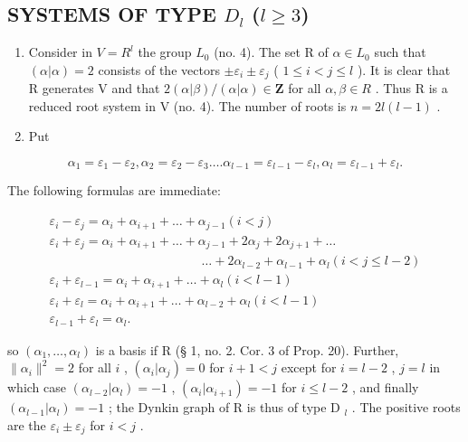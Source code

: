 \subsection{\texorpdfstring{SYSTEMS OF TYPE \(D_{l}\) (\(l \geqslant 3\))}{SYSTEMS OF TYPE D\_l (l >= 3)}}

\begin{enumerate}
\def\labelenumi{(\Roman{enumi})}
\item
  Consider in \(V = R^{l}\) the group \(L_{0}\) (no. 4). The set R of \(\alpha \in L_{0}\) such that \((\alpha|\alpha) = 2\) consists of the vectors \(\pm\varepsilon_{i} \pm \varepsilon_{j}\) ( \(1 \leqslant i < j \leqslant l\) ). It is clear that R generates V and that \(2(\alpha|\beta)/(\alpha|\alpha) \in \mathbf{Z}\) for all \(\alpha, \beta \in R\) . Thus R is a reduced root system in V (no. 4). The number of roots is \(n = 2l(l - 1)\) .
\item
  Put
\end{enumerate}

\[
\alpha_ {1} = \varepsilon_ {1} - \varepsilon_ {2}, \alpha_ {2} = \varepsilon_ {2} - \varepsilon_ {3} \dots . \alpha_ {l - 1} = \varepsilon_ {l - 1} - \varepsilon_ {l}, \alpha_ {l} = \varepsilon_ {l - 1} + \varepsilon_ {l}.
\]

The following formulas are immediate:

\[
\begin{array}{c} \varepsilon_ {i} - \varepsilon_ {j} = \alpha_ {i} + \alpha_ {i + 1} + \dots + \alpha_ {j - 1} (i <   j) \\ \varepsilon_ {i} + \varepsilon_ {j} = \alpha_ {i} + \alpha_ {i + 1} + \dots + \alpha_ {j - 1} + 2 \alpha_ {j} + 2 \alpha_ {j + 1} + \dots \\ \qquad \qquad \qquad \qquad \qquad \qquad \dots + 2 \alpha_ {l - 2} + \alpha_ {l - 1} + \alpha_ {l} (i <   j \leqslant l - 2) \\ \varepsilon_ {i} + \varepsilon_ {l - 1} = \alpha_ {i} + \alpha_ {i + 1} + \dots + \alpha_ {l} (i <   l - 1) \\ \varepsilon_ {i} + \varepsilon_ {l} = \alpha_ {i} + \alpha_ {i + 1} + \dots + \alpha_ {l - 2} + \alpha_ {l} (i <   l - 1) \\ \varepsilon_ {l - 1} + \varepsilon_ {l} = \alpha_ {l}. \end{array}
\]

so \((\alpha_{1},\ldots,\alpha_{l})\) is a basis if R (§ 1, no. 2. Cor. 3 of Prop. 20). Further, \(\| \alpha_{i}\|^{2}=2\) for all \(i\) , \((\alpha_{i}|\alpha_{j})=0\) for \(i+1<j\) except for \(i=l-2\) , \(j=l\) in which case \((\alpha_{l-2}|\alpha_{l})=-1\) , \((\alpha_{i}|\alpha_{i+1})=-1\) for \(i\leqslant l-2\) , and finally \((\alpha_{l-1}|\alpha_{l})=-1\) ; the Dynkin graph of R is thus of type D \(_{l}\) . The positive roots are the \(\varepsilon_{i}\pm\varepsilon_{j}\) for \(i<j\) .

